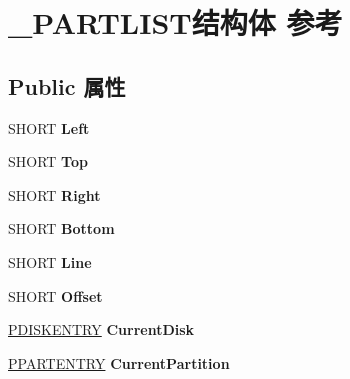 \hypertarget{struct___p_a_r_t_l_i_s_t}{}\section{\+\_\+\+P\+A\+R\+T\+L\+I\+S\+T结构体 参考}
\label{struct___p_a_r_t_l_i_s_t}
\subsection*{Public 属性}
\begin{DoxyCompactItemize}
\item 
\mbox{\label{struct___p_a_r_t_l_i_s_t_ae42df2a8ec3a40e3d354bd2505748746}} 
S\+H\+O\+RT {\bfseries Left}
\item 
\mbox{\label{struct___p_a_r_t_l_i_s_t_ad7fc6e53f9d071aa7592ac314ff668c1}} 
S\+H\+O\+RT {\bfseries Top}
\item 
\mbox{\label{struct___p_a_r_t_l_i_s_t_a954f91044d6db3f8043c2498863ec634}} 
S\+H\+O\+RT {\bfseries Right}
\item 
\mbox{\label{struct___p_a_r_t_l_i_s_t_a4572098e3b3deb1677656a6a2f525ee1}} 
S\+H\+O\+RT {\bfseries Bottom}
\item 
\mbox{\label{struct___p_a_r_t_l_i_s_t_a2c30b740b2f03fab6fe3fe7fffca62ce}} 
S\+H\+O\+RT {\bfseries Line}
\item 
\mbox{\label{struct___p_a_r_t_l_i_s_t_ad236c133bcf47f3d82afff7a4455c659}} 
S\+H\+O\+RT {\bfseries Offset}
\item 
\mbox{\label{struct___p_a_r_t_l_i_s_t_a5945d5e6b7123cb04a39fbc82e2e3ca7}} 
\hyperlink{struct___d_i_s_k_e_n_t_r_y}{P\+D\+I\+S\+K\+E\+N\+T\+RY} {\bfseries Current\+Disk}
\item 
\mbox{\label{struct___p_a_r_t_l_i_s_t_a723c179b315286325fbd130482e7c133}} 
\hyperlink{struct___p_a_r_t_e_n_t_r_y}{P\+P\+A\+R\+T\+E\+N\+T\+RY} {\bfseries Current\+Partition}
\item 
\mbox{\label{struct___p_a_r_t_l_i_s_t_aa6bb4be0cbb86d4cff47d24dbccedc76}} 

\end{DoxyCompactItemize}
